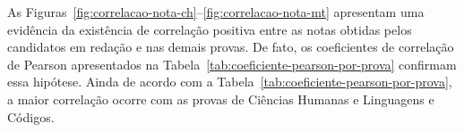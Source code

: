 \documentclass[12pt]{article}
\newcommand{\reffig}[1]{Fig.~\ref{fig:#1}}
\newcommand{\reftab}[1]{Tabela~\ref{tab:#1}}
\begin{document}


As Figuras~\ref{fig:correlacao-nota-ch}--\ref{fig:correlacao-nota-mt} apresentam uma evidência da existência de correlação positiva entre as notas obtidas pelos candidatos em redação e nas demais provas.
De fato, os coeficientes de correlação de Pearson apresentados na \reftab{coeficiente-pearson-por-prova} confirmam essa hipótese.
Ainda de acordo com a \reftab{coeficiente-pearson-por-prova}, a maior correlação ocorre com as provas de Ciências Humanas e Linguagens e Códigos.
\end{document}
